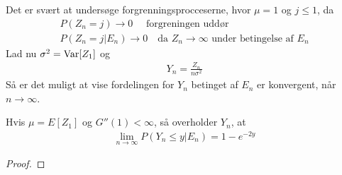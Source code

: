 Det er svært at undersøge forgrenningsprocceserne, hvor $\mu=1$ og $j\leq 1$, da
\begin{align}
    P(Z_n=j)\to 0 \quad \text{ forgreningen uddør}
    \\
    P(Z_n=j |E_n) \to 0 \quad \text{da } Z_n\to\infty \text{ under betingelse af } E_n 
\end{align}
Lad nu $\sigma^2=\textnormal{Var}[Z_1]$ og  
\begin{align*}
Y_n=\frac{Z_n}{n\sigma^2}    
\end{align*}
Så er det muligt at vise fordelingen for $Y_n$ betinget af $E_n$ er konvergent, når $n\to\infty$.  

\begin{thm} \label{thm:thm6.7.8grim}
Hvis $\mu=E[Z_1]$ og $G''(1)<\infty$, så overholder $Y_n$, at
\begin{align*}
    \lim_{n\to\infty}P(Y_n\leq y|E_n) = 1-e^{-2y}
\end{align*}
\end{thm} 
\begin{proof}

\end{proof}










